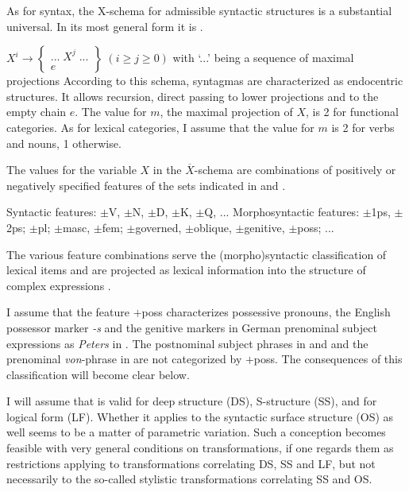 \documentclass[output=paper,colorlinks,citecolor=brown]{langscibook}
\begin{document}
As for syntax, the X-schema for admissible syntactic structures is a substantial universal. In its most general form it is .

\ea \label{ex:zi91:6} $X^{i} \rightarrow \left\{ \begin{array}{c} ...\; X^{j} \;... \\ e \end{array} \right\} \; (i \geq j \geq 0)$
\z
\vspace{-0,3cm}
 \hspace{0,8cm}with ‘...’ being a sequence of maximal projections
\vspace{0,3cm} \newline
\noindent According to this schema, syntagmas are characterized as endocentric structures. It allows recursion, direct passing to lower projections and to the empty chain $e$. The value for $m$, the maximal projection of $X$, is 2 for functional categories. As for lexical categories, I assume that the value for $m$ is 2 for verbs and nouns, 1 otherwise.

The values for the variable $X$ in the $\overline{X}$-schema  are combinations of positively or negatively specified features of the sets indicated in  and .

\ea \label{ex:zi91:7} Syntactic features: $\pm$V, $\pm$N, $\pm$D, $\pm$K, $\pm$Q, ...
\ex \label{ex:zi91:8} Morphosyntactic features: $\pm$1ps, $\pm$2ps; $\pm$pl; $\pm$masc, $\pm$fem; $\pm$governed, $\pm$oblique, $\pm$genitive, $\pm$poss; ...
\z

\noindent The various feature combinations serve the (morpho)syntactic classification of lexical items and are projected as lexical information into the structure of complex expressions \citep[see][]{Zimmermann87Syntactic-categorization, Zimmermann88Die-substantivische-Verwendung, Zimmermann88Wohin-mit-Affixen}.

I assume that the feature $+$poss characterizes possessive pronouns, the English possessor marker \textit{-s} and the genitive markers in German prenominal subject expressions as \textit{Peters} in . The postnominal subject phrases in  and  and the prenominal \textit{von}-phrase in  are not categorized by $+$poss. The consequences of this classification will become clear below.

I will assume that  is valid for deep structure (DS), S-structure (SS), and for logical form (LF). Whether it applies to the syntactic surface structure (OS) as well seems to be a matter of parametric variation. Such a conception becomes feasible with  very general conditions on transformations, if one regards them as restrictions applying to transformations correlating DS, SS and LF, but not necessarily to the so-called stylistic transformations correlating SS and OS.
\end{document}
